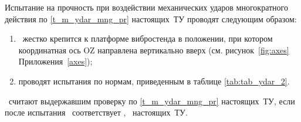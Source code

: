 Испытание на прочность при воздействии механических ударов многократного действия по \ref{t_m_ydar_mng_pr} настоящих~ТУ проводят следующим образом:

\begin{enumerate}
	\item \dut \ жестко крепится к платформе вибростенда в положении, при котором координатная ось OZ направлена вертикально вверх (см. рисунок~\ref{fig:axes} Приложения~\ref{axes});
	\item проводят испытания по нормам, приведенным в таблице \ref{tab:tab_ydar_2}.
\end{enumerate}

\dut \ считают выдержавшим проверку по \ref{t_m_ydar_mng_pr} настоящих~ТУ, если после испытания \dut \ соответствует \treb, \trebafter \ настоящих~ТУ.
